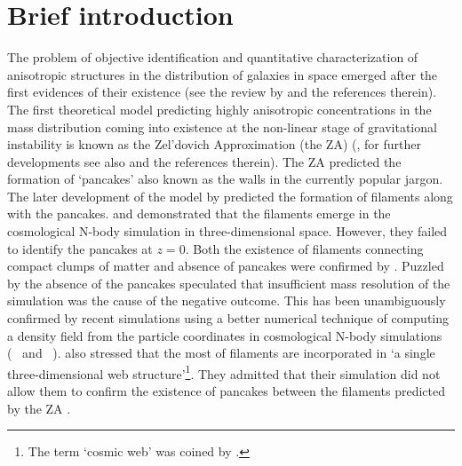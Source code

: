 \section{Brief introduction} \label{sec:intro}



The problem of objective identification and quantitative characterization of anisotropic structures 
in the distribution of galaxies in space emerged after the first evidences of their existence
(see the review by \citealt{Oort1983} and the references therein). The first theoretical model predicting highly anisotropic concentrations in the mass distribution coming into existence at the non-linear stage of gravitational instability is known as the Zel'dovich Approximation (the ZA) (\citealt{Zeldovich1970}, for further developments see also \citealt{Shandarin1989} and the references therein). The ZA predicted the formation of  `pancakes'  also known as the walls in the currently popular jargon. The later development
of the model by \citet{Arnold1982} predicted the formation of filaments along with the pancakes. \citet{Klypin1983a} and \citet{Shandarin1984} demonstrated that the filaments emerge in the cosmological N-body simulation in three-dimensional space.
However, they failed to identify the pancakes at $z=0$. Both the existence of filaments connecting compact clumps of matter and absence of pancakes were confirmed by \citet{Frenk1983}. Puzzled by the absence of the pancakes \citet{Klypin1983a}
speculated that insufficient mass resolution of the simulation was the cause  of the negative outcome. 
This has been unambiguously confirmed by recent simulations using a better numerical technique of computing a density field from the particle
coordinates in cosmological N-body simulations (~\citealt{Shandarin2012} and ~\citealt{Abel2012}). \citealt{Klypin1983a} 
also stressed that the most of filaments are  incorporated in 
`a single three-dimensional web structure'\footnote{The term `cosmic web' was coined by  \citet{Bond1996}.}. 
They admitted that
their simulation did not allow them to confirm the existence of pancakes between the filaments predicted by the ZA \citep{Arnold1982}.

